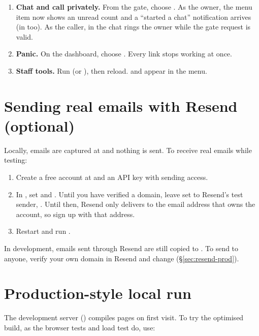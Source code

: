 \begin{enumerate}
  \item \textbf{Chat and call privately.} From the gate, choose . As the owner, the  menu item now shows an unread count and a ``started a chat'' notification arrives (in  too). As the caller,  in the chat rings the owner while the gate request is valid.
  \item \textbf{Panic.} On the dashboard, choose . Every link stops working at once.
  \item \textbf{Staff tools.} Run  (or ), then reload.  and  appear in the menu.
\end{enumerate}

\section{Sending real emails with Resend (optional)}

Locally, emails are captured at  and nothing is sent. To receive real emails while testing:
\begin{enumerate}
  \item Create a free account at  and an API key with sending access.
  \item In , set  and . Until you have verified a domain, leave  set to Resend's test sender, . Until then, Resend only delivers to the email address that owns the account, so sign up with that address.
  \item Restart  and run .
\end{enumerate}
In development, emails sent through Resend are still copied to . To send to anyone, verify your own domain in Resend and change  (§\ref{sec:resend-prod}).

\section{Production-style local run}

The development server () compiles pages on first visit. To try the optimised build, as the browser tests and load test do, use:

